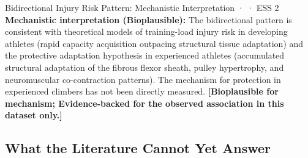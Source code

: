 \begin{bioplausbox}{Bidirectional Injury Risk Pattern: Mechanistic Interpretation · \bioplausible · ESS 2}
\textbf{Mechanistic interpretation (Bioplausible):} The bidirectional pattern is consistent with theoretical models of training-load injury risk in developing athletes (rapid capacity acquisition outpacing structural tissue adaptation) and the protective adaptation hypothesis in experienced athletes (accumulated structural adaptation of the fibrous flexor sheath, pulley hypertrophy, and neuromuscular co-contraction patterns). The mechanism for protection in experienced climbers has not been directly measured. \textbf{[Bioplausible for mechanism; Evidence-backed for the observed association in this dataset only.]}
\end{bioplausbox}

\subsection{What the Literature Cannot Yet Answer}
\label{subsec:injury-gaps}

